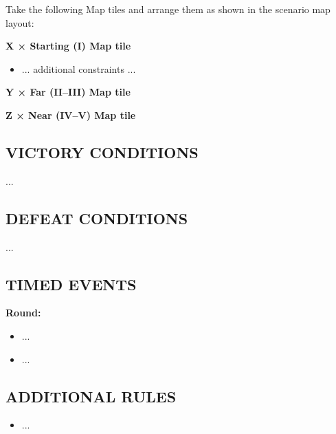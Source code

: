 \begin{multicols*}{2}
Take the following Map tiles and arrange them as shown in the scenario map layout:

  \textbf{X × Starting (I) Map tile}
\begin{itemize}
    \item ... additional constraints ...
\end{itemize}

\textbf{Y × Far (II--III) Map tile}

\textbf{Z × Near (IV--V) Map tile}

\subsection*{\MakeUppercase{Victory Conditions}}
...

\subsection*{\MakeUppercase{Defeat Conditions}}
...

\subsection*{\MakeUppercase{Timed Events}}

\textbf{ Round:}
\begin{itemize}
  \item ...
  \item ...
\end{itemize}

%
%
%

\subsection*{\MakeUppercase{Additional Rules}}

\begin{itemize}
    \item ...
\end{itemize}

\end{multicols*}

